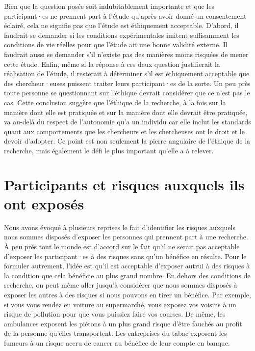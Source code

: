 \documentclass[
  12pt,
]{book}
\begin{document}
Bien que la question posée soit indubitablement importante et que les participant·es ne prennent part à l'étude qu'après avoir donné un consentement éclairé, cela ne signifie pas que l'étude est éthiquement acceptable. D'abord, il faudrait se demander si les conditions expérimentales imitent suffisamment les conditions de vie réelles pour que l'étude ait une bonne validité externe. Il faudrait aussi se demander s'il n'existe pas des manières moins risquées de mener cette étude. Enfin, même si la réponse à ces deux question justifierait la réalisation de l'étude, il resterait à déterminer s'il est éthiquement acceptable que des chercheur·euses puissent traiter leurs participant·es de la sorte. Un peu près toute personne se questionnant sur l'éthique devrait considérer que ce n'est pas le cas. Cette conclusion suggère que l'éthique de la recherche, à la fois sur la manière dont elle est pratiquée et sur la manière dont elle devrait être pratiquée, va au-delà du respect de l'autonomie qu'a un individu car elle inclut les standards quant aux comportements que les chercheurs et les chercheuses ont le droit et le devoir d'adopter. Ce point est non seulement la pierre angulaire de l'éthique de la recherche, mais également le défi le plus important qu'elle a à relever.

\chapter{Participants et risques auxquels ils ont exposés}\label{participants-et-risques-auxquels-ils-ont-exposuxe9s}

Nous avons évoqué à plusieurs reprises le fait d'identifier les risques auxquels nous sommes disposés d'exposer les personnes qui prennent part à une recherche. À peu près tout le monde est d'accord sur le fait qu'il ne serait pas acceptable d'exposer les participant·es à des risques sans qu'un bénéfice en résulte. Pour le formuler autrement, l'idée est qu'il est acceptable d'exposer autrui à des risques à la condition que cela bénéficie au plus grand nombre. En dehors des conditions de recherche, on peut même aller jusqu'à considérer que nous sommes disposés à exposer les autres à des risques si nous pouvons en tirer un bénéfice. Par exemple, si vous vous rendez en voiture au supermarché, vous exposez vos voisins à un risque de pollution pour que vous puissiez faire vos courses. De même, les ambulances exposent les piétons à un plus grand risque d'être fauchés au profit de la personne qu'elles transportent. Les entreprises du tabac exposent les fumeurs à un risque accru de cancer au bénéfice de leur compte en banque.
\end{document}
